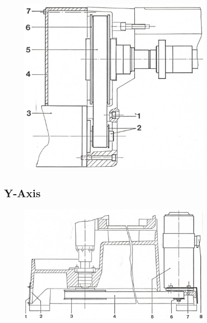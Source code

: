 \begin{figure}[H]
    \centering
    \includegraphics[width=0.85\textwidth]{images/chapter9/feed_drive_motor_x_axis.jpg}
    \label{fig:feed_drive_motor_x_axis}
\end{figure}

\newpage

\subsection*{Y-Axis}

\begin{figure}[H]
    \centering
    \includegraphics[width=0.85\textwidth]{images/chapter9/feed_drive_motor_y_axis.jpg}
    \label{fig:feed_drive_motor_y_axis}
\end{figure}

